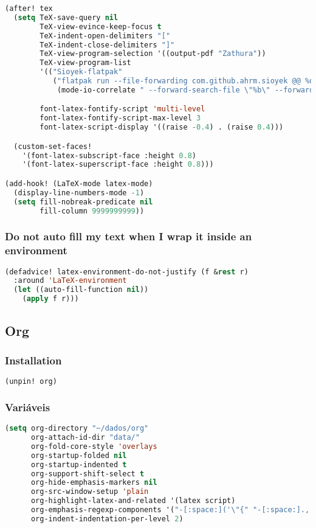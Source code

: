 \documentclass[11pt]{article}
\begin{document}
\begin{lstlisting}[language=Lisp]
(after! tex
  (setq TeX-save-query nil
        TeX-view-evince-keep-focus t
        TeX-indent-open-delimiters "["
        TeX-indent-close-delimiters "]"
        TeX-view-program-selection '((output-pdf "Zathura"))
        TeX-view-program-list
        '(("Sioyek-flatpak"
           ("flatpak run --file-forwarding com.github.ahrm.sioyek @@ %o @@"
            (mode-io-correlate " --forward-search-file \"%b\" --forward-search-line %n --inverse-search \"emacsclient -n +%2 %1\""))))

        font-latex-fontify-script 'multi-level
        font-latex-fontify-script-max-level 3
        font-latex-script-display '((raise -0.4) . (raise 0.4)))

  (custom-set-faces!
    '(font-latex-subscript-face :height 0.8)
    '(font-latex-superscript-face :height 0.8)))

(add-hook! (LaTeX-mode latex-mode)
  (display-line-numbers-mode -1)
  (setq fill-nobreak-predicate nil
        fill-column 9999999999))
\end{lstlisting}

\subsubsection{Do not auto fill my text when I wrap it inside an environment}
\label{sec:do-not-auto-fill-my-text-when-i-wrap-it-inside-an-environment}
\begin{lstlisting}[language=Lisp]
(defadvice! latex-environment-do-not-justify (f &rest r)
  :around 'LaTeX-environment
  (let ((auto-fill-function nil))
    (apply f r)))
\end{lstlisting}


\subsection{Org}
\label{sec:org}


\subsubsection{Installation}
\label{sec:installation-4}
\begin{lstlisting}[language=Lisp]
(unpin! org)
\end{lstlisting}

\subsubsection{Variáveis}
\label{sec:variaveis}
\begin{lstlisting}[language=Lisp]
(setq org-directory "~/dados/org"
      org-attach-id-dir "data/"
      org-fold-core-style 'overlays
      org-startup-folded nil
      org-startup-indented t
      org-support-shift-select t
      org-hide-emphasis-markers nil
      org-src-window-setup 'plain
      org-highlight-latex-and-related '(latex script)
      org-emphasis-regexp-components '("-[:space:]('\"{" "-[:space:].,:!?;'\")}\\[" "{}*[:space:]" "." 1)
      org-indent-indentation-per-level 2)
\end{lstlisting}
\end{document}
